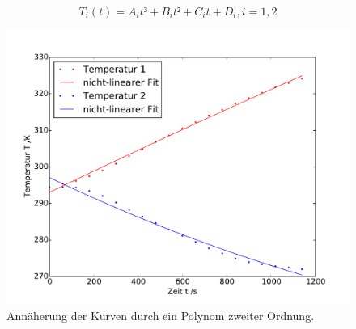 \begin{equation}
	T_i(t)=A_i t³ + B_i t² + C_i t + D_i , i=1,2
	\label{eq:t-verlauf_Grad3}
\end{equation}
\newpage
\begin{figure}
\includegraphics[width=\textwidth]{Bilder/Temperaturfit_Grad2.pdf}
	\caption{Annäherung der Kurven durch ein Polynom zweiter Ordnung.}
\end{figure}

